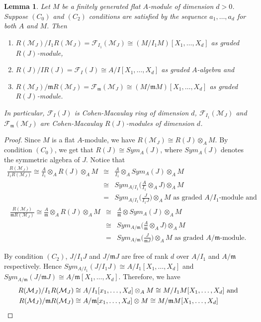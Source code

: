 \documentclass[10pt,a4paper]{amsart}
\newtheorem{lemma}{Lemma}
\def\M{{\mathcal M}}
\newcommand{\m}{\mathfrak m}
\def\F{{\mathcal F}}
\begin{document}
\begin{lemma}\label{lemma-2.2(a)}
	Let $M$ be a finitely generated flat $A$-module of dimension $d>0$. Suppose $(C_0)$ and $(C_2)$ conditions are satisfied by the sequence $a_1,\ldots,a_d$ for both $A$ and $M$. Then 
    \begin{enumerate}
        \item $R(\M_J)/I_1R(\M_J)=\F_{I_1}(\M_J)\cong (M/I_1M)[X_1,\ldots,X_d]$ as graded $R(J)$-module,
        \item $R(J)/IR(J)=\F_I(J) \cong A/I[X_1,\ldots,X_d]$ as graded $A$-algebra and 
        \item $R(\M_J)/\m R(\M_J)=\F_{\m}(\M_J)\cong (M/\m M)[X_1,\ldots,X_d]$ as graded $R(J)$-module. 	
    \end{enumerate}  
	In particular, $\F_I(J)$ is Cohen-Macaulay ring of dimension $d$, $\F_{I_1}(\M_J)$ and  $\F_\m(\M_J)$ are Cohen-Macaulay $R(J)$-modules of dimension $d$.
\end{lemma}
\begin{proof}
    Since $M$ is a flat $A$-module, we have $R(\M_J)\cong R(J) \otimes_A M.$ By condition $(C_0)$, we get that $R(J)\cong Sym_A(J)$, where $Sym_A(J)$ denotes the symmetric algebra of $J$. Notice that 
\begin{eqnarray*}
\frac{R(\M_J)}{I_1R(\M_J)}\cong \frac{A}{I_1}\otimes_A R(J)\otimes_A M &\cong&  \frac{A}{I_1} \otimes_A Sym_A(J)\otimes_A M\\
&\cong& Sym_{A/I_1}\Big(\frac{A}{I_1} \otimes_A J\Big)\otimes_A M\\
&=&Sym_{A/I_1}\Big(\frac{J}{I_1J}\Big)\otimes_A M \text{ as graded $A/I_1$-module and } 
\end{eqnarray*}
\begin{eqnarray*}
    \frac{R(\M_J)}{\m R(\M_J)}\cong \frac{A}{\m}\otimes_A R(J)\otimes_A M &\cong&  \frac{A}{\m} \otimes Sym_A(J)\otimes_A M\\
    &\cong& Sym_{A/\m}\Big(\frac{A}{\m} \otimes_A J\Big)\otimes_A M\\&=&Sym_{A/\m}\Big(\frac{J}{\m J}\Big)\otimes_A M  \text{ as graded $A/\m$-module. }
\end{eqnarray*}

By condition $(C_2)$, $J/I_1J$ and $J/\m J$ are free  of rank $d$ over $A/I_1$ and $A/\m$ respectively. Hence $Sym_{A/I_1}(J/I_1J)\cong A/I_1[X_1,\ldots,X_d]$ and $Sym_{A/\m}(J/\m J)\cong A/\m[X_1,\ldots,X_d]$.   Therefore, we have 
\begin{align*}
R(\M_J)/I_1R(\M_J)&\cong A/I_1[x_1,\ldots,X_d]\otimes_A M \cong M/I_1M[X_1,\ldots, X_d] \text{ and }\\
R(\M_J)/\m R(\M_J)&\cong A/\m [x_1,\ldots,X_d]\otimes M \cong M/\m M[X_1,\ldots, X_d]\qedhere
\end{align*}
\end{proof}
\end{document}
